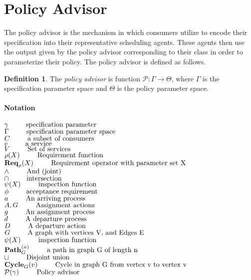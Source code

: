 \documentclass{article}
\newcommand{\notate}[2]{$#1 \hspace{0.35in} \mbox{#2}$}
\newenvironment{notation}
{
    \newpage
    \paragraph{\Huge Notation}
    \begin{flushleft}
}
{
    \end{flushleft}
}
\theoremstyle{definition}
\newtheorem{definition}{Definition}[section]
\theoremstyle{remark}
\newcommand{\reqop}[2]{\mathbf{Req}_{#1}(#2)}
\newcommand{\path}[2]{\mathbf{Path}^{#2}_{#1}}
\newcommand{\cyclepath}[1]{\mathbf{Cycle}_{#1}}
\begin{document}
	\section{Policy Advisor}
	The policy advisor is the mechanism in which consumers utilize to encode their specification into their
    representative scheduling agents. These agents then use the output given by the policy advisor corresponding
    to their class in order to parameterize their policy. The policy advisor is defined as follows.

    \begin{definition}
        The \emph{policy advisor} is function $\mathcal{P}: \Gamma \rightarrow \Theta$, where $\Gamma$ is the specification
		parameter space and $\Theta$ is the policy parameter space.
    \end{definition}


	


	\newpage    

	\begin{notation}
		\notate{\gamma}{specification parameter}\\
		\notate{\Gamma}{specification parameter space}\\
		\notate{C}{a subset of consumers}\\
		\notate{v}{a service}\\
		\notate{V}{Set of services}\\
		\notate{\rho(X)}{Requirement function}\\
		\notate{\reqop{\rho}{X}}{Requirement operator with parameter set X}\\
                \notate{\wedge}{And (joint)}\\
                \notate{\cap}{intersection}\\
                \notate{\psi(X)}{inspection function}\\
                \notate{\phi}{acceptance requirement}\\
		\notate{a}{An arriving process}\\
		\notate{A,G}{Assignment actions}\\
		\notate{g}{An assignment process}\\
		\notate{d}{A departure process}\\
		\notate{D}{A departure action}\\
                \notate{G}{A graph with vertices V, and Edges E}\\
                \notate{\psi(X)}{inspection function}\\
                \notate{\path{G}{(n)}}{a path in graph G of length n}\\
                \notate{\sqcup}{Disjoint union}\\
                \notate{\cyclepath{G}(v)}{Cycle in graph G from vertex v to vertex v}\\
                \notate{\mathcal{P}(\gamma)}{Policy advisor}
        \end{notation}

	\newpage
	
\end{document}
